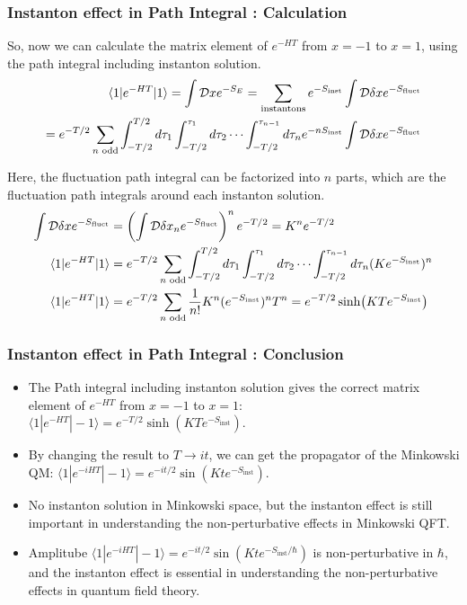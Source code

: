 \documentclass[10pt]{beamer}
\begin{document}
\begin{frame}
    \frametitle{Instanton effect in Path Integral : Calculation}

    So, now we can calculate the matrix element of $e^{-HT}$ from $x = -1$ to $x = 1$, using the path integral including instanton solution.
    \begin{align*}
    \small
    \langle 1 | e^{-HT} | 1 \rangle = \int \mathcal{D}x e^{-S_E} = \sum_{\text{instantons}} e^{-S_{\text{inst}}} \int \mathcal{D}\delta x e^{-S_{\text{fluct}}} \\
    = e^{-T/2} \sum_{n \text{ odd}} \int_{-T/2}^{T/2} d\tau_1 \int_{-T/2}^{\tau_1} d\tau_2 \cdots \int_{-T/2}^{\tau_{n-1}} d\tau_n e^{-nS_{\text{inst}}} \int \mathcal{D}\delta x e^{-S_{\text{fluct}}} 
    \end{align*}


Here, the fluctuation path integral can be factorized into $n$ parts, which are the fluctuation path integrals around each instanton solution.
\begin{align*}
\small
\int \mathcal{D}\delta x e^{-S_{\text{fluct}}} &= \left(\int \mathcal{D}\delta x_n e^{-S_{\text{fluct}}}\right)^n e^{-T/2}= K^n e^{-T/2} \\
    \langle 1 | e^{-HT} | 1 \rangle &= e^{-T/2} \sum_{n \text{ odd}} \int_{-T/2}^{T/2} d\tau_1 \int_{-T/2}^{\tau_1} d\tau_2 \cdots \int_{-T/2}^{\tau_{n-1}} d\tau_n (Ke^{-S_{\text{inst}}})^n \\
    \langle 1 | e^{-HT} | 1 \rangle &=e^{-T/2} \sum_{n \text{ odd}} \frac{1}{n!} K^n(e^{-S_{\text{inst}}})^n T^n = e^{-T/2} \sinh(KTe^{-S_{\text{inst}}}) \\
\end{align*}
\end{frame}

\begin{frame}
\frametitle{Instanton effect in Path Integral : Conclusion}
\begin{itemize}
\item The Path integral including instanton solution gives the correct matrix element of $e^{-HT}$ from $x = -1$ to $x = 1$: $\langle 1 | e^{-HT} | -1 \rangle = e^{-T/2} \sinh(KTe^{-S_{\text{inst}}})$.
\item By changing the result to $T \rightarrow it$, we can get the propagator of the Minkowski QM: $\langle 1 | e^{-iHT} | -1 \rangle = e^{-it/2} \sin(Kte^{-S_{\text{inst}}})$.
\item No instanton solution in Minkowski space, but the instanton effect is still important in understanding the non-perturbative effects in Minkowski QFT.
\item Amplitube $\langle 1 | e^{-iHT} | -1 \rangle = e^{-it/2} \sin(Kte^{-S_{\text{inst}}/\hbar})$ is non-perturbative in $\hbar$, and the instanton effect is essential in understanding the non-perturbative effects in quantum field theory.
\end{itemize}
\end{frame}
\end{document}

